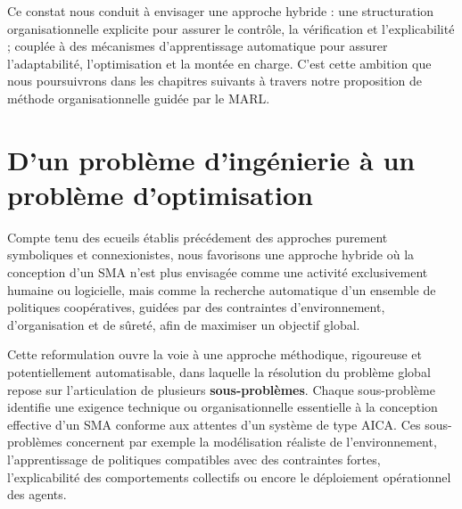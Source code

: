 Ce constat nous conduit à envisager une approche hybride : une structuration organisationnelle explicite pour assurer le contrôle, la vérification et l'explicabilité ; couplée à des mécanismes d'apprentissage automatique pour assurer l'adaptabilité, l'optimisation et la montée en charge. C'est cette ambition que nous poursuivrons dans les chapitres suivants à travers notre proposition de méthode organisationnelle guidée par le \ac{MARL}.



\chapter{D'un problème d'ingénierie à un problème d'optimisation}\label{chap:hypotheses}


Compte tenu des ecueils établis précédement des approches purement symboliques et connexionistes, nous favorisons une approche hybride où la conception d'un \ac{SMA} n'est plus envisagée comme une activité exclusivement humaine ou logicielle, mais comme la recherche automatique d'un ensemble de politiques coopératives, guidées par des contraintes d'environnement, d'organisation et de sûreté, afin de maximiser un objectif global.

Cette reformulation ouvre la voie à une approche méthodique, rigoureuse et potentiellement automatisable, dans laquelle la résolution du problème global repose sur l'articulation de plusieurs \textbf{sous-problèmes}. Chaque sous-problème identifie une exigence technique ou organisationnelle essentielle à la conception effective d'un \ac{SMA} conforme aux attentes d'un système de type \ac{AICA}. Ces sous-problèmes concernent par exemple la modélisation réaliste de l'environnement, l'apprentissage de politiques compatibles avec des contraintes fortes, l'explicabilité des comportements collectifs ou encore le déploiement opérationnel des agents.

